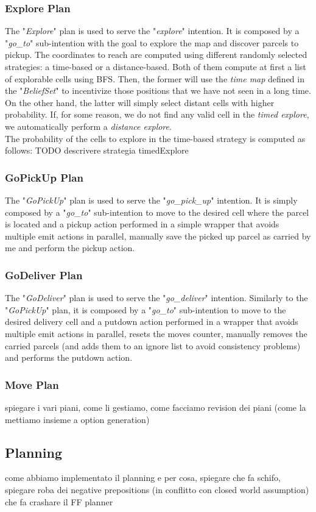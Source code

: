         \subsubsection{Explore Plan}
            The "\textit{Explore}" plan is used to serve the "\textit{explore}" intention. It is composed by a "\textit{go\_to}" sub-intention with the goal to explore the map and discover parcels to pickup. The coordinates to reach are computed using different randomly selected strategies: a time-based or a distance-based. Both of them compute at first a list of explorable cells using BFS. Then, the former will use the \textit{time map} defined in the "\textit{BeliefSet}" to incentivize those positions that we have not seen in a long time. On the other hand, the latter will simply select distant cells with higher probability. If, for some reason, we do not find any valid cell in the \textit{timed explore}, we automatically perform a \textit{distance explore}.
            \medskip\\
            The probability of the cells to explore in the time-based strategy is computed as follows:
            TODO descrivere strategia timedExplore

        \subsubsection{GoPickUp Plan}
            The "\textit{GoPickUp}" plan is used to serve the "\textit{go\_pick\_up}" intention. It is simply composed by a "\textit{go\_to}" sub-intention to move to the desired cell where the parcel is located and a pickup action performed in a simple wrapper that avoids multiple emit actions in parallel, manually save the picked up parcel as carried by me and perform the pickup action. 

        \subsubsection{GoDeliver Plan}
            The "\textit{GoDeliver}" plan is used to serve the "\textit{go\_deliver}" intention. Similarly to the "\textit{GoPickUp}" plan, it is composed by a "\textit{go\_to}" sub-intention to move to the desired delivery cell and a putdown action performed in a wrapper that avoids multiple emit actions in parallel, resets the moves counter, manually removes the carried parcels (and adds them to an ignore list to avoid consistency problems) and performs the putdown action. 

        \subsubsection{Move Plan}

        spiegare i vari piani, come li gestiamo, come facciamo revision dei piani (come la mettiamo insieme a option generation)

    \subsection{Planning}
        come abbiamo implementato il planning e per cosa, spiegare che fa schifo, spiegare roba dei negative prepositions (in conflitto con closed world assumption) che fa crashare il FF planner
